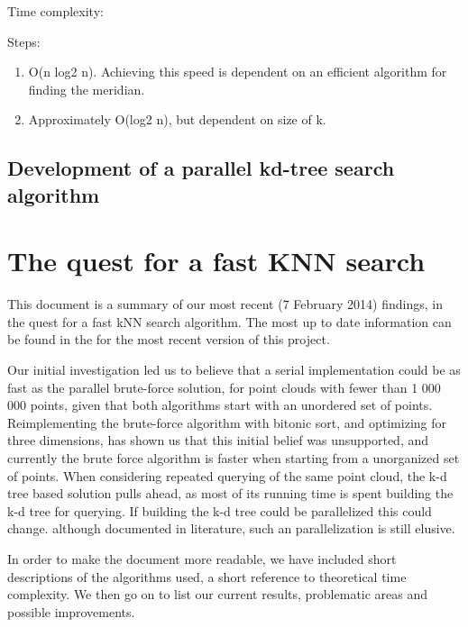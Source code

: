Time complexity:

Steps:
\begin{enumerate}
    \item O(n log2 n). Achieving this speed is dependent on an efficient algorithm for finding the meridian.
    \item Approximately O(log2 n), but dependent on size of k.
\end{enumerate}




\subsection{Development of a parallel kd-tree search algorithm} %
\label{sub:development_of_a_parallel_kd_tree_search_algorithm}


\section{The quest for a fast KNN search} %
\label{sec:the_quest_for_a_fast_KNN_search}

This document is a summary of our most recent (7 February 2014) findings, in the quest for a fast kNN search algorithm. The most up to date information can be found in the
for the most recent version of this project.

Our initial investigation led us to believe that a serial implementation could be as fast as the parallel brute-force solution, for point clouds with fewer than 1 000 000 points, given that both algorithms start with an unordered set of points. Reimplementing the brute-force algorithm with bitonic sort, and optimizing for three dimensions, has shown us that this initial belief was unsupported, and currently the brute force algorithm is faster when starting from a unorganized set of points. When considering repeated querying of the same point cloud, the k-d tree based solution pulls ahead, as most of its running time is spent building the k-d tree for querying. If building the k-d tree could be parallelized this could change. although documented in literature, such an parallelization is still elusive.

In order to make the document more readable, we have included short descriptions of the algorithms used, a short reference to theoretical time complexity. We then go on to list our current results, problematic areas and possible improvements.

